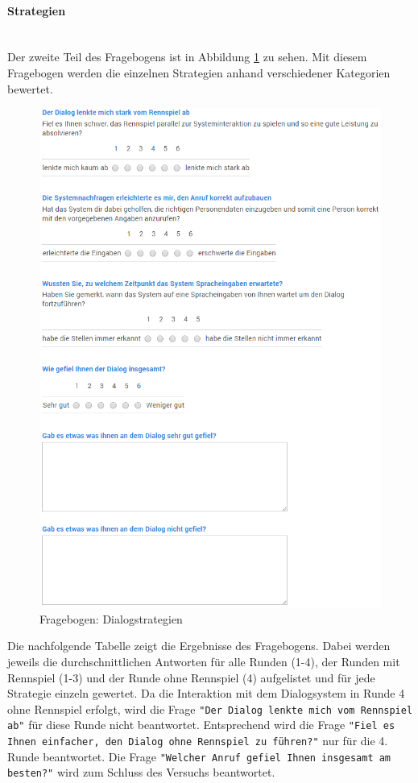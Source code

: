 \documentclass[12pt,a4paper]{scrartcl}
\begin{document}
\paragraph{Strategien}
~\\
Der zweite Teil des Fragebogens ist in Abbildung \ref{fbstrategien1} zu sehen. 
Mit diesem Fragebogen werden die einzelnen Strategien anhand verschiedener Kategorien bewertet.
\begin{figure}[H]
\begin{center}
\includegraphics[width=14cm]{fbdialog.png}
\caption{Fragebogen: Dialogstrategien}
\label{fbstrategien1}
\end{center}
\end{figure}
Die nachfolgende Tabelle zeigt die Ergebnisse des Fragebogens. Dabei werden jeweils die durchschnittlichen Antworten für alle Runden (1-4), der Runden mit Rennspiel (1-3) und der Runde ohne Rennspiel (4) aufgelistet und für jede Strategie einzeln gewertet.
\newline \newline
Da die Interaktion mit dem Dialogsystem in Runde 4 ohne Rennspiel erfolgt, wird die Frage \texttt{"Der Dialog lenkte mich vom Rennspiel ab"} für diese Runde nicht beantwortet. Entsprechend wird die Frage \texttt{"Fiel es Ihnen einfacher, den Dialog ohne Rennspiel zu führen?"} nur für die 4. Runde beantwortet.
Die Frage \texttt{"Welcher Anruf gefiel Ihnen insgesamt am besten?"} wird zum Schluss des Versuchs beantwortet.
\newpage
\end{document}
